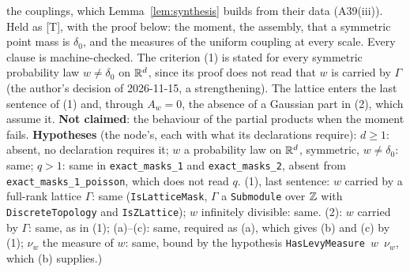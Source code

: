 \begin{proposition}
{the couplings, which Lemma~\ref{lem:synthesis} builds from their data (A39(iii)). Held as [T], with
the proof below: the moment, the
assembly, that a symmetric point mass is $\delta_0$, and the \Levy{} measures of the uniform
coupling at every scale. Every clause is machine-checked. The criterion (1) is stated for every symmetric probability law
$w \ne \delta_0$ on $\mathbb{R}^d$, since its proof does not read that $w$ is carried by $\Gamma$ (the
author's decision of 2026-11-15, a strengthening). The lattice enters the last sentence of (1) and,
through $A_w = 0$, the absence of a Gaussian part in (2), which assume it. \textbf{Not claimed}: the behaviour of the partial products when the moment fails.
\textbf{Hypotheses} (the node's, each with what its declarations require): $d \ge 1$: absent, no
declaration requires it; $w$ a probability law on $\mathbb{R}^d$, symmetric, $w \ne \delta_0$: same; $q > 1$:
same in \texttt{exact\_masks\_1} and \texttt{exact\_masks\_2}, absent from
\texttt{exact\_masks\_1\_poisson}, which does not read $q$. (1), last sentence: $w$ carried by a
full-rank lattice $\Gamma$: same (\texttt{IsLatticeMask}, $\Gamma$ a \texttt{Submodule} over
$\mathbb{Z}$ with \texttt{DiscreteTopology} and \texttt{IsZLattice}); $w$ infinitely divisible: same.
(2): $w$ carried by $\Gamma$: same, as in (1); (a)--(c): same, required as (a), which gives (b) and (c)
by (1); $\nu_w$ the \Levy{} measure of $w$: same, bound by the hypothesis
\texttt{HasLevyMeasure}~$w$~$\nu_w$, which (b) supplies.)}
\end{proposition}

